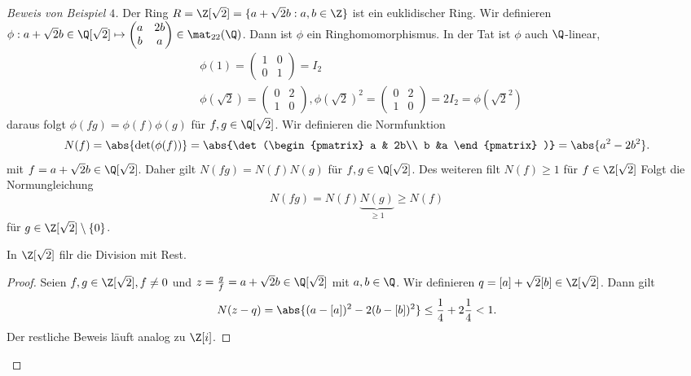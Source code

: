 \begin{proof}[Beweis von Beispiel $4$]
	Der Ring $R = \Z [\sqrt{2}] = \{a + \sqrt{2} b: a,b \in \Z\}$ ist ein euklidischer Ring.
	Wir definieren $\phi: a + \sqrt{2} b \in \Q[\sqrt{2}] \mapsto \begin{pmatrix} 
		a & 2b\\ b & a
	\end{pmatrix} \in \mat_{22}(\Q)$.
	Dann ist $\phi$ ein Ringhomomorphismus.
	In der Tat ist $\phi$ auch $\Q$-linear, 
	\begin{align*}
		&\phi(1) = \begin{pmatrix} 
			1 &0\\ 0 &1
		\end{pmatrix} = I_2\\
		&\phi(\sqrt{2}) = \begin{pmatrix} 
			0 &2\\ 1 &0
		\end{pmatrix}, \phi(\sqrt{2})^2 = \begin{pmatrix} 
			0 &2\\ 1 &0
		\end{pmatrix}  = 2I_2 = \phi(\sqrt{2}^2)
	\end{align*} 
	daraus folgt $\phi(fg) = \phi(f) \phi(g)$ für $f,g \in \Q[\sqrt{2}]$.
	Wir definieren die Normfunktion
	\begin{align*}
		N(f) = \abs{\det(\phi(f))} = \abs{\det(\begin{pmatrix} 
				a & 2b\\ b &a
		\end{pmatrix} )} = \abs{a^2 - 2b^2}
	.\end{align*}
	mit $f = a + \sqrt{2} b \in \Q[\sqrt{2}]$.
	Daher gilt $N(fg) = N(f)N(g)$ für $f,g \in \Q[\sqrt{2}]$.
	Des weiteren filt $N(f) \geq 1$ für $f \in \Z[\sqrt{2}]$ 
	Folgt die Normungleichung 
	\[
		N(fg) = N(f) \underbrace{N(g)}_{\geq 1} \geq N(f)
	\]
	für $g \in \Z[\sqrt{2}] \setminus \{0\} $.
	\begin{lemma}
		In $\Z[\sqrt{2}]$ filr die Division mit Rest.
	\end{lemma}
	\begin{proof}
		Seien $f,g \in \Z[\sqrt{2}], f \neq 0$ und $z= \frac{g}{f} = a + \sqrt{2} b \in \Q[\sqrt{2}]$ mit $a,b \in \Q$.
		Wir definieren $q = [a] + \sqrt{2} [b] \in \Z[\sqrt{2}]$. Dann gilt
		\begin{align*}
			N(z-q) = \abs{(a-[a])^2 - 2 (b-[b])^2} \leq \frac{1}{4} + 2 \frac{1}{4} < 1
		.\end{align*}
		Der restliche Beweis läuft analog zu $\Z[i]$.
	\end{proof}
\end{proof}

